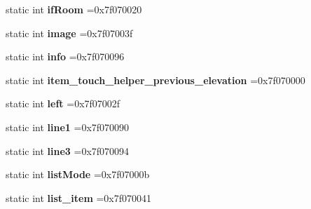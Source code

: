 \begin{DoxyCompactItemize}
static int {\bfseries if\+Room} =0x7f070020
\item 
\mbox{\label{classandroid_1_1support_1_1v7_1_1recyclerview_1_1R_1_1id_adbab7a59758f6e645becb192b4598e3f}} 
static int {\bfseries image} =0x7f07003f
\item 
\mbox{\label{classandroid_1_1support_1_1v7_1_1recyclerview_1_1R_1_1id_a857a27f8a10158a06ef5de6dbefd942c}} 
static int {\bfseries info} =0x7f070096
\item 
\mbox{\label{classandroid_1_1support_1_1v7_1_1recyclerview_1_1R_1_1id_ac4265b008bae0197c824160e535a8729}} 
static int {\bfseries item\+\_\+touch\+\_\+helper\+\_\+previous\+\_\+elevation} =0x7f070000
\item 
\mbox{\label{classandroid_1_1support_1_1v7_1_1recyclerview_1_1R_1_1id_aab421c67fcc5c39232caf7fca5015dee}} 
static int {\bfseries left} =0x7f07002f
\item 
\mbox{\label{classandroid_1_1support_1_1v7_1_1recyclerview_1_1R_1_1id_a12bd8daa39df02e240cdff474421a50a}} 
static int {\bfseries line1} =0x7f070090
\item 
\mbox{\label{classandroid_1_1support_1_1v7_1_1recyclerview_1_1R_1_1id_a4d64e2aed05112515fcfce5363d198d5}} 
static int {\bfseries line3} =0x7f070094
\item 
\mbox{\label{classandroid_1_1support_1_1v7_1_1recyclerview_1_1R_1_1id_a8228ec556482e6ada24687976fef143a}} 
static int {\bfseries list\+Mode} =0x7f07000b
\item 
\mbox{\label{classandroid_1_1support_1_1v7_1_1recyclerview_1_1R_1_1id_a545baa9c5de44599c0b7dc09425b59f5}} 
static int {\bfseries list\+\_\+item} =0x7f070041
\item 
\mbox{\label{classandroid_1_1support_1_1v7_1_1recyclerview_1_1R_1_1id_ade6791b5bfeb84faa73ca6cb2e0db7f8}} 

\end{DoxyCompactItemize}
